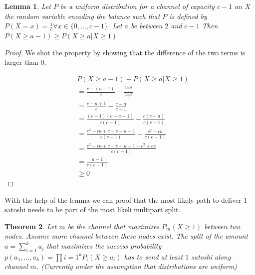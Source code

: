 \documentclass[10pt,twocolumn]{article}
\newtheorem{theorem}{Theorem}[section]
\newtheorem{lemma}[theorem]{Lemma}
\begin{document}
\begin{lemma}
  Let $P$ be a uniform distribution for a channel of capacity $c-1$ an $X$ the random variable encoding the balance such that $P$ is defined by $P(X=x)=\frac{1}{c} \forall x \in \{0,\dots,c-1\}$. Let $a$ be between $2$ and $c-1$
  Then $P(X\geq a-1) \geq P(X \geq a| X \geq 1)$
\end{lemma}
\begin{proof}
  We shot the property by showing that the difference of the two terms is larger than $0$.

  \begin{equation*}
  \begin{aligned}
  & P(X\geq a-1) - P(X\geq a | X\geq 1) \\
  & = \frac{c - (a-1)}{c} - \frac{\frac{c-a}{c}}{\frac{c-1}{c}} \\ 
  & = \frac{c - a + 1}{c} - \frac{c-a}{c-1} \\
  & = \frac{(c-1)(c-a+1)}{c(c-1)} - \frac{c(c-a)}{c(c-1)} \\
  & = \frac{c^2 -ca +c -c +a -1}{c(c-1)} - \frac{c^2-ca}{c(c-1)} \\
  & = \frac{c^2 -ca +c -c +a -1-c^2+ca}{c(c-1)} \\
  & = \frac{a -1}{c(c-1)} \\
  & \geq 0
  \end{aligned}
  \end{equation*}
\end{proof}

With the help of the lemma we can proof that the most likely path to deliver $1$ satoshi needs to be part of the most likeli multipart split.

\begin{theorem}
  Let $m$ be the channel that maximizes $P_m(X\geq 1)$ between two nodes. Assume more channel between these nodes exist. The split of the amount $a=\sum_{i=1}^ka_i$ that maximizes the success probability $p(a_1,\dots,a_k)=\prod{i=1}^kP_i(X\geq a_i)$ has to send at least $1$ satoshi along channel $m$. (Currently under the assumption that distributions are uniform)
\end{theorem}
\end{document}
